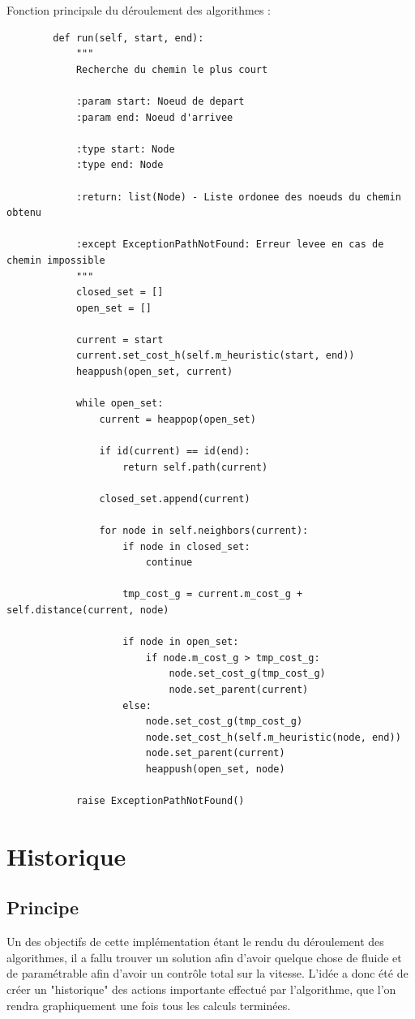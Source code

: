 \documentclass{report}
\begin{document}
	Fonction principale du déroulement des algorithmes :
	\begin{lstlisting}
	    def run(self, start, end):
        	"""
        	Recherche du chemin le plus court

        	:param start: Noeud de depart
        	:param end: Noeud d'arrivee

        	:type start: Node
        	:type end: Node

        	:return: list(Node) - Liste ordonee des noeuds du chemin obtenu

        	:except ExceptionPathNotFound: Erreur levee en cas de chemin impossible
        	"""
        	closed_set = []
        	open_set = []

        	current = start
        	current.set_cost_h(self.m_heuristic(start, end))
        	heappush(open_set, current)

        	while open_set:
     			current = heappop(open_set)
         		
            	if id(current) == id(end):
                	return self.path(current)

            	closed_set.append(current)
            	
            	for node in self.neighbors(current):
                	if node in closed_set:
                    	continue

                	tmp_cost_g = current.m_cost_g + self.distance(current, node)

                	if node in open_set:
                    	if node.m_cost_g > tmp_cost_g:
                        	node.set_cost_g(tmp_cost_g)
                        	node.set_parent(current)
                	else:
                    	node.set_cost_g(tmp_cost_g)
                    	node.set_cost_h(self.m_heuristic(node, end))
                    	node.set_parent(current)
                    	heappush(open_set, node)
                    	
        	raise ExceptionPathNotFound()
	\end{lstlisting}

\chapter{Historique}
	\section{Principe}
	Un des objectifs de cette implémentation étant le rendu du déroulement des algorithmes, il a fallu trouver un solution afin d'avoir quelque chose de fluide et de paramétrable afin d'avoir un contrôle total sur la vitesse.
	L'idée a donc été de créer un "historique" des actions importante effectué par l'algorithme, que l'on rendra graphiquement une fois tous les calculs terminées.\\
\end{document}
